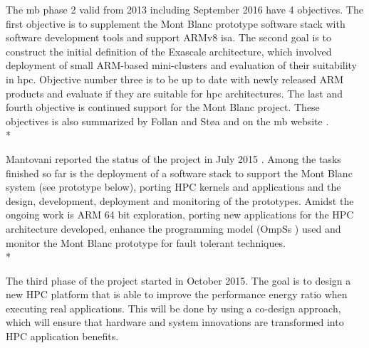 The \gls{mb} phase 2 valid from 2013 including September 2016 have 4 objectives. The first objective is to supplement the Mont Blanc prototype software stack with software development tools and support ARMv8 \gls{isa}. The second goal is to construct the initial definition of the Exascale architecture, which involved deployment of small ARM-based mini-clusters and evaluation of their suitability in \gls{hpc}. Objective number three is to be up to date with newly released ARM products and evaluate if they are suitable for \gls{hpc} architectures. The last and fourth objective is continued support for the Mont Blanc project. These objectives is also summarized by Follan and Støa \cite{mt:T&S} and on the \gls{mb} website \cite{m:MB}.\\*

Mantovani reported the status of the project in July 2015 \cite{m:MB-15}. Among the tasks finished so far is the deployment of a software stack to support the Mont Blanc system (see prototype below), porting HPC kernels and applications and the design, development, deployment and monitoring of the prototypes. Amidst the ongoing work is ARM 64 bit exploration, porting new applications for the HPC architecture developed, enhance the programming model (OmpSs \cite{m:ompss}) used and monitor the Mont Blanc prototype for fault tolerant techniques. \\*

The third phase of the project started in October 2015. The goal is to design a new HPC platform that is able to improve the performance energy ratio when executing real applications. This will be done by using a co-design approach, which will ensure that hardware and system innovations are transformed into HPC application benefits.

